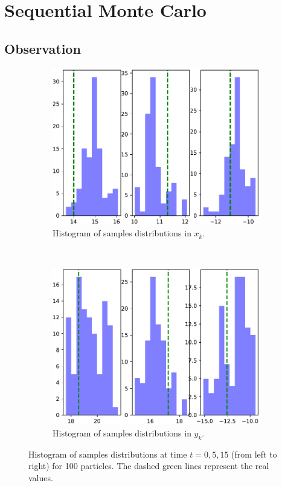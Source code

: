 \documentclass[english, DIV=13]{scrartcl}
\begin{document}
\FloatBarrier

\section{Sequential Monte Carlo}
\subsection{Observation}

\begin{figure}
    \centering
    \begin{subfigure}{0.49\textwidth}
        \includegraphics[width=\textwidth]{figures/hist-x-100}
        \caption{Histogram of samples distributions in $x_k$.}
        \label{fig:q3-hist-x-100}
    \end{subfigure}%
    ~
    \begin{subfigure}{0.49\textwidth}
        \includegraphics[width=\textwidth]{figures/hist-y-100}
        \caption{Histogram of samples distributions in $y_k$.}
        \label{fig:q3-hist-y-100}
    \end{subfigure}
    \caption{Histogram of samples distributions  at time $t = 0, 5, 15$
    (from left to right) for 100 particles. The dashed green lines represent the real
    values.}
\end{figure}
\end{document}
